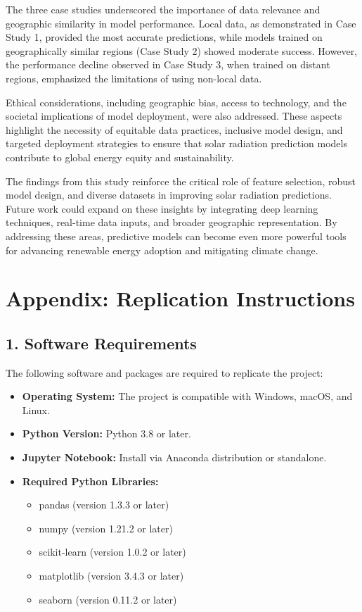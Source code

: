 \documentclass[10pt,twocolumn]{article}
\begin{document}
\begin{itemize}
The three case studies underscored the importance of data relevance and geographic similarity in model performance. Local data, as demonstrated in Case Study 1, provided the most accurate predictions, while models trained on geographically similar regions (Case Study 2) showed moderate success. However, the performance decline observed in Case Study 3, when trained on distant regions, emphasized the limitations of using non-local data.

Ethical considerations, including geographic bias, access to technology, and the societal implications of model deployment, were also addressed. These aspects highlight the necessity of equitable data practices, inclusive model design, and targeted deployment strategies to ensure that solar radiation prediction models contribute to global energy equity and sustainability.

The findings from this study reinforce the critical role of feature selection, robust model design, and diverse datasets in improving solar radiation predictions. Future work could expand on these insights by integrating deep learning techniques, real-time data inputs, and broader geographic representation. By addressing these areas, predictive models can become even more powerful tools for advancing renewable energy adoption and mitigating climate change.
\pagebreak
\newpage
\appendix

\newpage\section*{Appendix: Replication Instructions}

\subsection*{1. Software Requirements}
The following software and packages are required to replicate the project:
\begin{itemize}
    \item \textbf{Operating System:} The project is compatible with Windows, macOS, and Linux.
    \item \textbf{Python Version:} Python 3.8 or later.
    \item \textbf{Jupyter Notebook:} Install via Anaconda distribution or standalone.
    \item \textbf{Required Python Libraries:}
    \begin{itemize}
        \item pandas (version 1.3.3 or later)
        \item numpy (version 1.21.2 or later)
        \item scikit-learn (version 1.0.2 or later)
        \item matplotlib (version 3.4.3 or later)
        \item seaborn (version 0.11.2 or later)
    \end{itemize}
\end{itemize}


\end{itemize}
\end{document}
